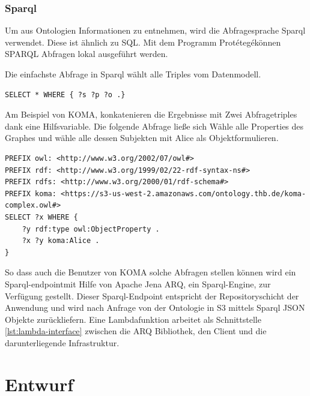 \documentclass[
12pt,
english,
ngerman,
headsepline,
twoside,
openright,
numbers=noenddot,version=first
]{scrreprt}
\begin{document}
\subsubsection{Sparql}
Um aus Ontologien Informationen zu entnehmen, wird die Abfragesprache \acrfull{Sparql} 
verwendet. Diese ist ähnlich zu SQL. Mit dem Programm \glqq Protétegé\grqq können SPARQL Abfragen lokal ausgeführt werden.

Die einfachste Abfrage in Sparql wählt alle Triples vom Datenmodell.

\begin{lstlisting}[language=Sparql]
SELECT * WHERE { ?s ?p ?o .}
\end{lstlisting}

Am Beispiel von KOMA, konkatenieren die Ergebnisse mit Zwei Abfragetriples dank eine Hilfsvariable. Die folgende Abfrage ließe sich \glqq Wähle alle Properties des Graphes und wähle alle dessen Subjekten mit Alice als Objekt\grqq formulieren. \\
\begin{lstlisting}
PREFIX owl: <http://www.w3.org/2002/07/owl#>
PREFIX rdf: <http://www.w3.org/1999/02/22-rdf-syntax-ns#>
PREFIX rdfs: <http://www.w3.org/2000/01/rdf-schema#>
PREFIX koma: <https://s3-us-west-2.amazonaws.com/ontology.thb.de/koma-complex.owl#>
SELECT ?x WHERE {
	?y rdf:type owl:ObjectProperty .
	?x ?y koma:Alice .
}
\end{lstlisting}

So dass auch die Benutzer von \acrshort{KOMA} solche Abfragen stellen können wird ein \glqq Sparql-endpoint\grqq mit Hilfe von Apache Jena ARQ, ein Sparql-Engine, zur Verfügung gestellt. 
Dieser Sparql-Endpoint entspricht der Repositoryschicht der Anwendung und wird nach Anfrage von der Ontologie in S3 mittels Sparql JSON Objekte zurückliefern.
Eine Lambdafunktion arbeitet als Schnittstelle \ref{lst:lambda-interface} zwischen die ARQ Bibliothek, den Client und die darunterliegende Infrastruktur.


\section{Entwurf}
\label{sec:design}

\end{document}
